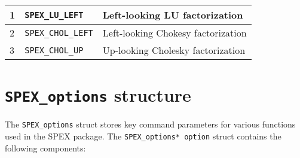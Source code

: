 \documentclass[12pt]{report}
\theoremstyle{definition}
\begin{document}
{\small
\begin{center}
\begin{tabular}{llp{4in}}
\hline
1 & \verb|SPEX_LU_LEFT|      & Left-looking LU factorization \\
\hline
2 & \verb|SPEX_CHOL_LEFT|    & Left-looking Chokesy factorization\\
\hline
3 & \verb|SPEX_CHOL_UP|      & Up-looking Cholesky factorization \\
\hline
\end{tabular}
\end{center}
}

\section{\texttt{SPEX\_options} structure}
\label{ss:SPEX_options_struct}

The \verb|SPEX_options| struct stores key command parameters for various
functions used in the SPEX package. The \verb|SPEX_options* option| struct
contains the following components:
\end{document}
